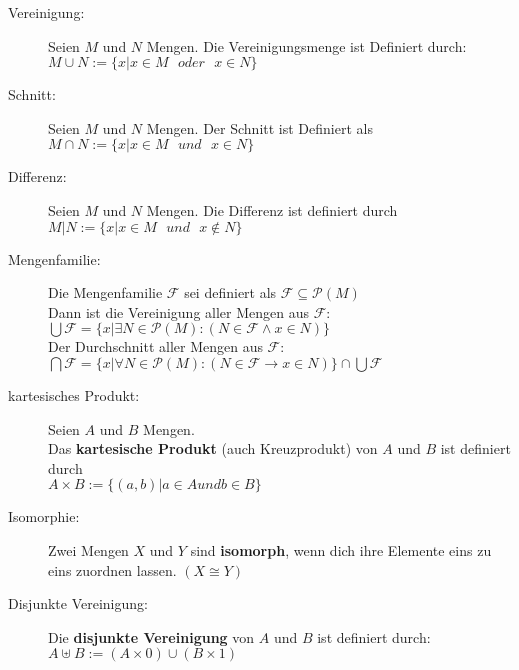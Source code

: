 \begin{description}
  \item [Vereinigung:] 
    Seien $M$ und $N$ Mengen. Die Vereinigungsmenge ist Definiert durch: 
    $M \cup N := \{x | x \in M \text{ }oder\text{ } x \in N\}$

  \item [Schnitt:] 
    Seien $M$ und $N$ Mengen. Der Schnitt ist Definiert als 
    $M \cap N := \{x | x \in M \text{ }und\text{ } x \in N\}$

  \item [Differenz:] 
    Seien $M$ und $N$ Mengen. Die Differenz ist definiert durch 
    $M | N := \{x | x \in M \text{ }und\text{ } x \notin N\}$

  \item [Mengenfamilie:] 
    Die Mengenfamilie $\mathcal{F}$ sei definiert als 
    $\mathcal{F} \subseteq \mathcal{P}(M)$ \\
    Dann ist die Vereinigung aller Mengen aus $\mathcal{F}$:\\
    $\bigcup\mathcal{F} = \{x | \exists N \in \mathcal{P}(M) : (N \in \mathcal{F} \wedge x \in N)\}$ \\
    Der Durchschnitt aller Mengen aus $\mathcal{F}$: \\ 
    $\bigcap \mathcal{F} = \{x | \forall N \in \mathcal{P}(M) : (N \in \mathcal{F} \rightarrow x \in N)\} \cap \bigcup \mathcal{F}$ 

  \item [kartesisches Produkt:] 
    Seien $A$ und $B$ Mengen.\\
    Das \textbf{kartesische Produkt} (auch Kreuzprodukt) von $A$ und $B$ ist 
    definiert durch\\
    $A \times B := \{(a,b) | a \in A und b \in B\}$

  \item [Isomorphie:] 
    Zwei Mengen $X$ und $Y$ sind \textbf{isomorph}, wenn dich ihre Elemente eins
    zu eins zuordnen lassen. $(X \cong Y)$

  \item [Disjunkte Vereinigung:] 
    Die \textbf{disjunkte Vereinigung} von $A$ und $B$ ist definiert durch: \\
    $A \uplus B := (A \times {0}) \cup (B \times {1})$
\end{description}

